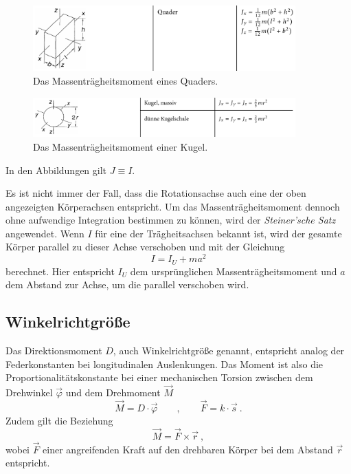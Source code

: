 \begin{figure}
    \centering
    \includegraphics[width=0.9\textwidth]{plots/TrägheitQuader.png}
    \caption{Das Massenträgheitsmoment eines Quaders.\cite{taschenbuch}}
    \label{fig:traegQuader}
\end{figure}

\begin{figure}
    \centering
    \includegraphics[width=0.9\textwidth]{plots/TrägheitKugel.png}
    \caption{Das Massenträgheitsmoment einer Kugel.\cite{taschenbuch}}
    \label{fig:traegKug}
\end{figure}

In den Abbildungen gilt $J \equiv I$.

Es ist nicht immer der Fall, dass die Rotationsachse auch eine der oben angezeigten Körperachsen entspricht.
Um das Massenträgheitsmoment dennoch ohne aufwendige Integration bestimmen zu können, wird der \textit{Steiner'sche
Satz} angewendet. Wenn $I$ für eine der Trägheitsachsen bekannt ist, wird der gesamte Körper parallel
zu dieser Achse verschoben und mit der Gleichung
\begin{equation}
    I = I_U + ma^2
\end{equation}
berechnet. Hier entspricht $I_U$ dem ursprünglichen Massenträgheitsmoment und $a$ dem Abstand zur Achse, um die 
parallel verschoben wird.

\subsection{Winkelrichtgröße}
Das Direktionsmoment $D$, auch Winkelrichtgröße genannt, entspricht analog der Federkonstanten bei longitudinalen Auslenkungen. Das Moment ist also
die Proportionalitätskonstante bei einer mechanischen Torsion zwischen dem Drehwinkel $\vec{\varphi}$ und dem Drehmoment $\vec{M}$
\begin{equation}
    \label{eqn:FederAnalogie}
    \vec{M} = D\cdot \vec{\varphi} \qquad , \qquad \vec{F} = k\cdot \vec{s}\:.
\end{equation}
Zudem gilt die Beziehung 
\begin{equation}
    \label{eqn:DrehKraft}
    \vec{M} = \vec{F} \times \vec{r}\:,
\end{equation}
wobei $\vec{F}$ einer angreifenden Kraft auf den drehbaren Körper bei dem Abstand $\vec{r}$ entspricht.


